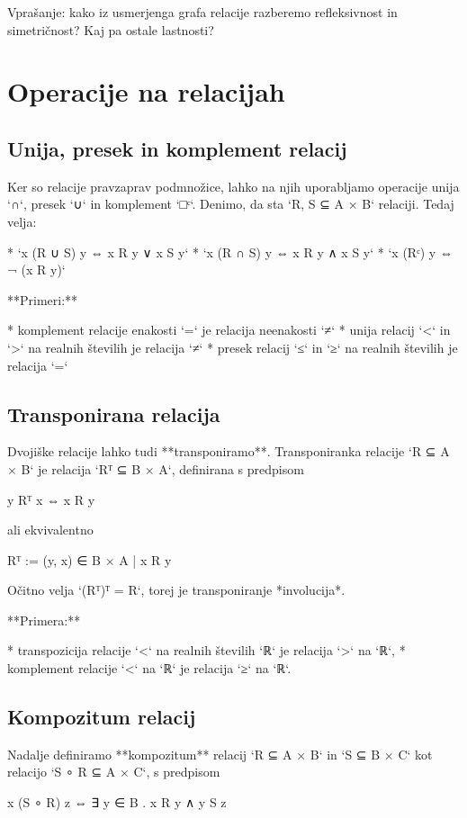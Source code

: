 Vprašanje: kako iz usmerjenga grafa relacije razberemo refleksivnost in
simetričnost? Kaj pa ostale lastnosti?

\section{Operacije na relacijah}

\subsection{Unija, presek in komplement relacij}

Ker so relacije pravzaprav podmnožice, lahko na njih uporabljamo operacije unija `∩`,
presek `∪` in komplement `□ᶜ`. Denimo, da sta `R, S ⊆ A × B` relaciji. Tedaj velja:

* `x (R ∪ S) y ⇔ x R y ∨ x S y`
* `x (R ∩ S) y ⇔ x R y ∧ x S y`
* `x (Rᶜ) y ⇔ ¬ (x R y)`

**Primeri:**

* komplement relacije enakosti `=` je relacija neenakosti `≠`
* unija relacij `<` in `>` na realnih številih je relacija `≠`
* presek relacij `≤` in `≥` na realnih številih je relacija `=`

\subsection{Transponirana relacija}

Dvojiške relacije lahko tudi **transponiramo**. Transponiranka relacije `R ⊆ A × B`
je relacija `Rᵀ ⊆ B × A`, definirana s predpisom

    y Rᵀ x ⇔ x R y

ali ekvivalentno

    Rᵀ := { (y, x) ∈ B × A | x R y }

Očitno velja `(Rᵀ)ᵀ = R`, torej je transponiranje *involucija*.

**Primera:**

* transpozicija relacije `<` na realnih številih `ℝ` je relacija `>` na `ℝ`,
* komplement relacije `<` na `ℝ` je relacija `≥` na `ℝ`.


\subsection{Kompozitum relacij}

Nadalje definiramo **kompozitum** relacij `R ⊆ A × B` in `S ⊆ B × C` kot relacijo
`S ∘ R ⊆ A × C`, s predpisom

    x (S ∘ R) z ⇔ ∃ y ∈ B . x R y ∧ y S z

